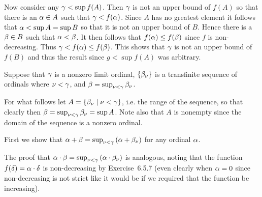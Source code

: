 \begin{questions}
{{      Now consider any $\gamma < \sup{f(A)}$.
      Then $\gamma$ is not an upper bound of $f(A)$ so that there is an $\alpha \in A$ such that $\gamma < f(\alpha)$.
      Since $A$ has no greatest element it follows that $\alpha < \sup{A} = \sup{B}$ so that it is not an upper bound of $B$.
      Hence there is a $\beta \in B$ such that $\alpha < \beta$.
      It then follows that $f(\alpha) \leq f(\beta)$ since $f$ is non-decreasing.
      Thus $\gamma < f(\alpha) \leq f(\beta)$.
      This shows that $\gamma$ is not an upper bound of $f(B)$ and thus the result since $g < \sup{f(A)}$ was arbitrary.
    }

    \mainthrm

    Suppose that $\gamma$ is a nonzero limit ordinal, $\left\{ \beta_\nu \right\}$ is a transfinite sequence of ordinals where $\nu < \gamma$, and $\beta = \sup_{\nu < \gamma} \beta_\nu$.

    For what follows let $A = \left\{ \beta_\nu \mid \nu < \gamma \right\}$, i.e. the range of the sequence, so that clearly then $\beta = \sup_{\nu < \gamma} \beta_\nu = \sup{A}$.
    Note also that $A$ is nonempty since the domain of the sequence is a nonzero ordinal.

    First we show that $\alpha + \beta = \sup_{\nu < \gamma} \left( \alpha + \beta_\nu \right)$ for any ordinal $\alpha$.

    The proof that $\alpha \cdot \beta = \sup_{\nu < \gamma} \left( \alpha \cdot \beta_\nu \right)$ is analogous, noting that the function $f(\delta) = \alpha \cdot \delta$ is non-decreasing by Exercise~6.5.7 (even clearly when $\alpha = 0$ since non-decreasing is not strict like it would be if we required that the function be increasing).

}
\end{questions}
